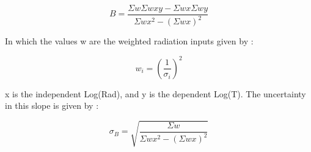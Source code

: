 \documentclass[aps,pre,twocolumn,nofootinbib]{revtex4}
\begin{document}
\begin{equation}
\label{Slope of a weighted linear best-fit}
B=\frac{\Sigma w \Sigma wxy-\Sigma wx \Sigma wy}{\Sigma wx^2-(\Sigma wx)^2}
\end{equation}

In which the values w are the weighted radiation inputs given by \cite{Taylor1997}:

\begin{equation}
\label{weights}
w_i=(\frac{1}{\sigma_i})^2
\end{equation}

x is the independent Log(Rad), and y is the dependent Log(T).  The uncertainty in this slope is given by \cite{Taylor1997} : 


\begin{equation}
\label{uncertainty in slope}
\sigma_B=\sqrt{\frac{\Sigma w}{\Sigma wx^2-(\Sigma wx)^2}}
\end{equation}
\end{document}
